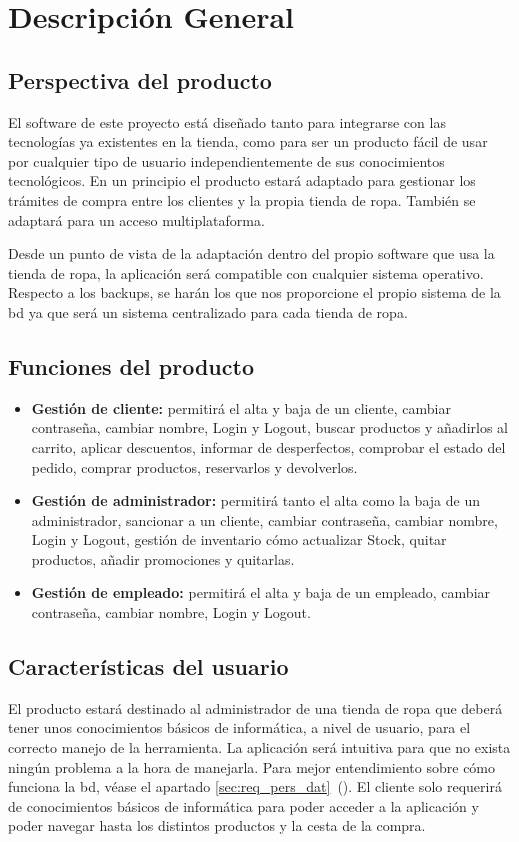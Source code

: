 \section{Descripción General }
\label{sec:desc_gen}
\subsection{Perspectiva del producto}
El software de este proyecto está diseñado tanto para integrarse con las tecnologías ya existentes en la tienda, como para ser un producto fácil de usar por cualquier tipo de usuario independientemente de sus conocimientos tecnológicos.
En un principio el producto estará adaptado para gestionar los trámites de compra entre los clientes y la propia tienda de ropa. También se adaptará para un acceso multiplataforma.

Desde un punto de vista de la adaptación dentro del propio software que usa la tienda de ropa, la aplicación será compatible con cualquier sistema operativo.\\
Respecto a los backups, se harán los que nos proporcione el propio sistema de la \gls{bd} ya que será un sistema centralizado para cada tienda de ropa.
\subsection{Funciones del producto}
\begin{itemize}
    \item\textbf{Gestión de cliente: }permitirá el alta y baja de un cliente, cambiar contraseña, cambiar nombre, Login y Logout, buscar productos y añadirlos al carrito, aplicar descuentos, informar de desperfectos, comprobar el estado del pedido, comprar productos, reservarlos y devolverlos.
    \item\textbf{Gestión de administrador: }permitirá tanto el alta como la baja de un administrador, sancionar a un cliente, cambiar contraseña, cambiar nombre, Login y Logout, gestión de inventario cómo actualizar Stock, quitar productos, añadir promociones y quitarlas.
    \item\textbf{Gestión de empleado: }permitirá el alta y baja de un empleado, cambiar contraseña, cambiar nombre, Login y Logout.
\end{itemize}

\subsection{Características del usuario}
El producto estará destinado al administrador de una tienda de ropa que deberá tener unos conocimientos básicos de informática, a nivel de usuario, para el correcto manejo de la herramienta. La aplicación será intuitiva para que no exista ningún problema a la hora de manejarla. Para mejor entendimiento sobre cómo funciona la \gls{bd}, véase el apartado \ref{sec:req_pers_dat}~().
El cliente solo requerirá de conocimientos básicos de informática para poder acceder a la aplicación y poder navegar hasta los distintos productos y la cesta de la compra.

